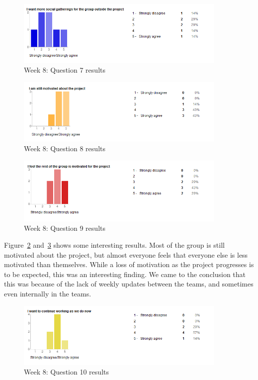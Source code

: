 \begin{figure}[th!]
\centering
\includegraphics[width=0.9\textwidth]{evaluation/week_8_images/social}
\caption{Week 8: Question 7 results}
\label{fig:W8Q7}
\end{figure}

\begin{figure}[th!]
\centering
\includegraphics[width=0.9\textwidth]{evaluation/week_8_images/i_motivated}
\caption{Week 8: Question 8 results}
\label{fig:W8Q8}
\end{figure}

\begin{figure}[th!]
\centering
\includegraphics[width=0.9\textwidth]{evaluation/week_8_images/them_motivated}
\caption{Week 8: Question 9 results}
\label{fig:W8Q9}
\end{figure}

Figure~\ref{fig:W8Q8} and~\ref{fig:W8Q9} shows some interesting results. Most of the group is still motivated about the project, but almost everyone feels that everyone else is less motivated than themselves. While a loss of motivation as the project progresses is to be expected, this was an interesting finding. We came to the conclusion that this was because of the lack of weekly updates between the teams, and sometimes even internally in the teams.

\begin{figure}[th!]
\centering
\includegraphics[width=0.9\textwidth]{evaluation/week_8_images/continue_work}
\caption{Week 8: Question 10 results}
\label{fig:W8Q10}
\end{figure}

